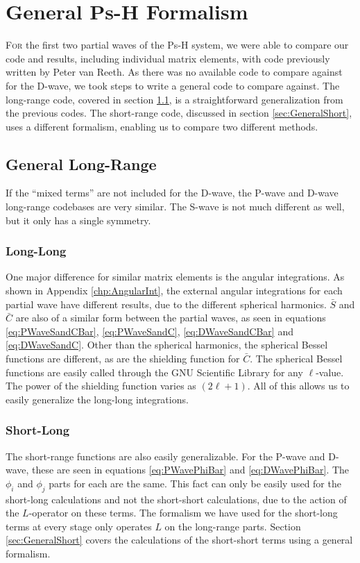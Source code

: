 \documentclass[Dissertation.tex]{subfiles}
\begin{document}
\clearpage
\pagebreak
\newpage

\chapter{General Ps-H Formalism}
\label{chp:General}

\lettrine{F}{or} the first two partial waves of the Ps-H system, we were able to compare our code and results, including individual matrix elements, with code previously written by Peter van Reeth. As there was no available code to compare against for the D-wave, we took steps to write a general code to compare against. The long-range code, covered in section \ref{sec:GeneralLong}, is a straightforward generalization from the previous codes. The short-range code, discussed in section \ref{sec:GeneralShort}, uses a different formalism, enabling us to compare two different methods.

\section{General Long-Range}
\label{sec:GeneralLong}

If the ``mixed terms'' are not included for the D-wave, the P-wave and D-wave long-range codebases are very similar. The S-wave is not much different as well, but it only has a single symmetry.

\subsection{Long-Long}
\label{sec:GeneralLongLong}
One major difference for similar matrix elements is the angular integrations. As shown in Appendix \ref{chp:AngularInt}, the external angular integrations for each partial wave have different results, due to the different spherical harmonics. $\bar{S}$ and $\bar{C}$ are also of a similar form between the partial waves, as seen in equations \ref{eq:PWaveSandCBar}, \ref{eq:PWaveSandC}, \ref{eq:DWaveSandCBar} and \ref{eq:DWaveSandC}. Other than the spherical harmonics, the spherical Bessel functions are different, as are the shielding function for $\bar{C}$. The spherical Bessel functions are easily called through the GNU Scientific Library \cite{} for any $\ell$-value. The power of the shielding function varies as $(2\ell + 1)$. All of this allows us to easily generalize the long-long integrations.

\subsection{Short-Long}
\label{sec:GeneralShortLong}
The short-range functions are also easily generalizable. For the P-wave and D-wave, these are seen in equations \ref{eq:PWavePhiBar} and \ref{eq:DWavePhiBar}. The $\phi_i$ and $\phi_j$ parts for each are the same. This fact can only be easily used for the short-long calculations and not the short-short calculations, due to the action of the $L$-operator on these terms. The formalism we have used for the short-long terms at every stage only operates $L$ on the long-range parts. Section \ref{sec:GeneralShort} covers the calculations of the short-short terms using a general formalism.
\end{document}
